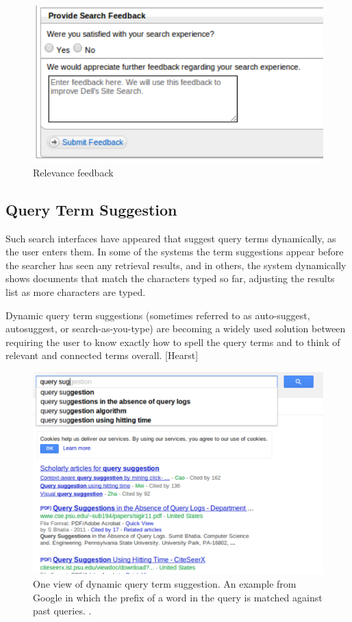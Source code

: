 \documentclass{sigchi}
\begin{document}
\begin{figure}[htp] %
\caption{Relevance feedback \protect} \label{figure_relevanceFeedback2}
\includegraphics[scale=0.70]{figures/relevanceFeedback2.pdf} 
\end{figure}

\subsection{Query Term Suggestion}

Such search interfaces have appeared that suggest query terms dynamically, as the user enters them.
In some of the systems the term suggestions appear before the searcher has seen any retrieval results, and in others, the system dynamically shows documents that match the characters typed so far, adjusting the results list as more characters are typed.

Dynamic query term suggestions (sometimes referred to as auto-suggest, autosuggest, or search-as-you-type) are becoming a widely used solution between requiring the user to know exactly how to spell the query terms and to think of relevant and connected terms overall. [Hearst]

\begin{figure}[htp] %
\caption{One view of dynamic query term suggestion. An example from Google in which the prefix of a word in the query is matched against past queries. \protect.} \label{figure_querysuggestion2}
\includegraphics[scale=0.41]{figures/dynamicQueryTermSuggestion2.pdf} 
\end{figure}
\end{document}
